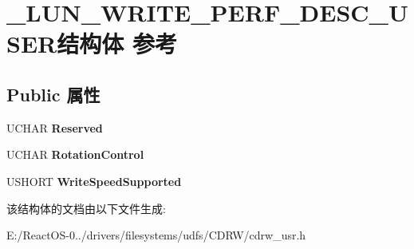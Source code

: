 \hypertarget{struct___l_u_n___w_r_i_t_e___p_e_r_f___d_e_s_c___u_s_e_r}{}\section{\+\_\+\+L\+U\+N\+\_\+\+W\+R\+I\+T\+E\+\_\+\+P\+E\+R\+F\+\_\+\+D\+E\+S\+C\+\_\+\+U\+S\+E\+R结构体 参考}
\label{struct___l_u_n___w_r_i_t_e___p_e_r_f___d_e_s_c___u_s_e_r}
\subsection*{Public 属性}
\begin{DoxyCompactItemize}
\item 
\mbox{\label{struct___l_u_n___w_r_i_t_e___p_e_r_f___d_e_s_c___u_s_e_r_a05a2b963539daba496d45b5431a26e55}} 
U\+C\+H\+AR {\bfseries Reserved}
\item 
\mbox{\label{struct___l_u_n___w_r_i_t_e___p_e_r_f___d_e_s_c___u_s_e_r_a74a5dab6ec5cc73758126630a6defd6f}} 
U\+C\+H\+AR {\bfseries Rotation\+Control}
\item 
\mbox{\label{struct___l_u_n___w_r_i_t_e___p_e_r_f___d_e_s_c___u_s_e_r_a88867ccc31c2cf23844a6673a962c328}} 
U\+S\+H\+O\+RT {\bfseries Write\+Speed\+Supported}
\end{DoxyCompactItemize}


该结构体的文档由以下文件生成\+:\begin{DoxyCompactItemize}
\item 
E\+:/\+React\+O\+S-\/0../drivers/filesystems/udfs/\+C\+D\+R\+W/cdrw\+\_\+usr.\+h\end{DoxyCompactItemize}
